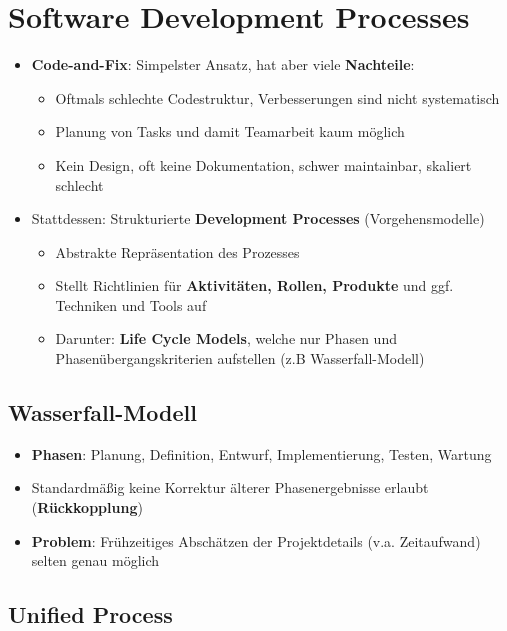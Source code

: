 \section{Software Development Processes}
\label{sdp:sec:software_development_processes}

\begin{itemize}
	\item \textbf{Code-and-Fix}: Simpelster Ansatz, hat aber viele \textbf{Nachteile}:
	\begin{itemize}
		\item Oftmals schlechte Codestruktur, Verbesserungen sind nicht systematisch
		\item Planung von Tasks und damit Teamarbeit kaum möglich
		\item Kein Design, oft keine Dokumentation, schwer maintainbar, skaliert schlecht
	\end{itemize}
	\item Stattdessen: Strukturierte \textbf{Development Processes} (Vorgehensmodelle)
	\begin{itemize}
		\item Abstrakte Repräsentation des Prozesses
		\item Stellt Richtlinien für \textbf{Aktivitäten, Rollen, Produkte} und ggf. Techniken und Tools auf
		\item Darunter: \textbf{Life Cycle Models}, welche nur Phasen und Phasenübergangskriterien aufstellen (z.B Wasserfall-Modell)
	\end{itemize}
\end{itemize}

\subsection{Wasserfall-Modell}
\label{sdp:sub:wasserfall_modell}

\begin{itemize}
	\item \textbf{Phasen}: Planung, Definition, Entwurf, Implementierung, Testen, Wartung
	\item Standardmäßig keine Korrektur älterer Phasenergebnisse erlaubt (\textbf{Rückkopplung})
	\item \textbf{Problem}: Frühzeitiges Abschätzen der Projektdetails (v.a. Zeitaufwand) selten genau möglich
\end{itemize}

\subsection{Unified Process}
\label{sdp:sub:unified_process}

